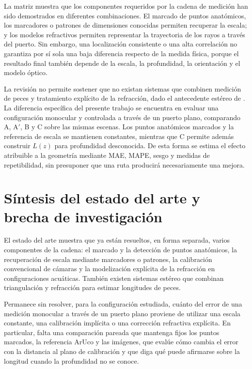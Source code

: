 \documentclass{report}
\newcommand{\Aprime}{A$'$}
\begin{document}
La matriz muestra que los componentes requeridos por la cadena de medición han sido demostrados en diferentes combinaciones. El marcado de puntos anatómicos, los marcadores o patrones de dimensiones conocidas permiten recuperar la escala; y los modelos refractivos permiten representar la trayectoria de los rayos a través del puerto. Sin embargo, una localización consistente o una alta correlación no garantiza por sí sola una baja diferencia respecto de la medida física, porque el resultado final también depende de la escala, la profundidad, la orientación y el modelo óptico.

La revisión no permite sostener que no existan sistemas que combinen medición de peces y tratamiento explícito de la refracción, dado el antecedente estéreo de \textcite{Seibold2026}. La diferencia específica del presente trabajo se encuentra en evaluar una configuración monocular y controlada a través de un puerto plano, comparando A, \Aprime, B y C sobre las mismas escenas. Los puntos anatómicos marcados y la referencia de escala se mantienen constantes, mientras que C permite además construir $L(z)$ para profundidad desconocida. De esta forma se estima el efecto atribuible a la geometría mediante MAE, MAPE, sesgo y medidas de repetibilidad, sin presuponer que una ruta producirá necesariamente una mejora.

\section{Síntesis del estado del arte y brecha de investigación}

El estado del arte muestra que ya están resueltos, en forma separada, varios componentes de la cadena: el marcado y la detección de puntos anatómicos, la recuperación de escala mediante marcadores o patrones, la calibración convencional de cámaras y la modelización explícita de la refracción en configuraciones acuáticas. También existen sistemas estéreo que combinan triangulación y refracción para estimar longitudes de peces.

Permanece sin resolver, para la configuración estudiada, cuánto del error de una medición monocular a través de un puerto plano proviene de utilizar una escala constante, una calibración implícita o una corrección refractiva explícita. En particular, falta una comparación pareada que mantenga fijos los puntos marcados, la referencia ArUco y las imágenes, que evalúe cómo cambia el error con la distancia al plano de calibración y que diga qué puede afirmarse sobre la longitud cuando la profundidad no se conoce.
\end{document}

